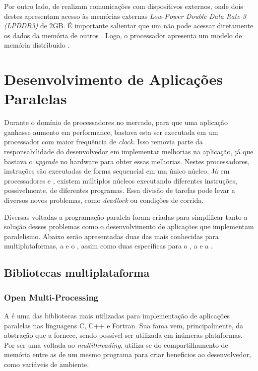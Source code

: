 Por outro lado, \clusters de \IO realizam comunicações com dispositivos externos, onde dois destes apresentam acesso às memórias externas \textit{Low-Power Double Data Rate 3 (LPDDR3)} de 2GB. É importante salientar que um \CC não pode acessar diretamente os dados da memória de outros \clusters. Logo, o processador apresenta um modelo de memória distribuído \cite{Castro-Souza-CCPE:2016, Podesta2018Stencil}.

\section{Desenvolvimento de Aplicações Paralelas}
\label{sec:bibliotecasdevparalelo}

Durante o domínio de processadores \singlecore no mercado, para que uma aplicação ganhasse aumento em performance, bastava esta ser executada em um processador com maior frequência de \textit{clock}. Isso removia parte da responsabilidade do desenvolvedor em implementar melhorias na aplicação, já que bastava o \textit{upgrade} no hardware para obter essas melhorias. Nestes processadores, instruções são executadas de forma sequencial em um único núcleo. Já em processadores \multicore e \manycore, existem múltiplos núcleos executando diferentes instruções, possivelmente, de diferentes programas. Essa divisão de tarefas pode levar a diversos novos problemas, como \textit{deadlock} ou condições de corrida.

Diversas \APIs voltadas a programação paralela foram criadas para simplificar tanto a solução desses problemas como o desenvolvimento de aplicações que implementam paralelismo. Abaixo serão apresentadas duas das mais conhecidas \APIs para multiplataformas, a \OpenMP e o \MPI, assim como duas \APIs específicas para o \mppa, a \ASYNC e a \IPC.

\subsection{Bibliotecas multiplataforma}
\label{sec:bibliotecasmultiplataforma}

\subsubsection{Open Multi-Processing}
\label{sec:openmp}

A \OpenMP é uma das bibliotecas mais utilizadas para implementação de aplicações paralelas nas linguagens C, C++ e Fortran. Sua fama vem, principalmente, da abstração que a \API fornece, sendo possível ser utilizada em inúmeras plataformas. Por ser uma \API voltada ao \textit{multithreading}, utiliza-se do compartilhamento de memória entre as \threads de um mesmo programa para criar beneficios ao desenvolvedor, como variáveis de ambiente.

